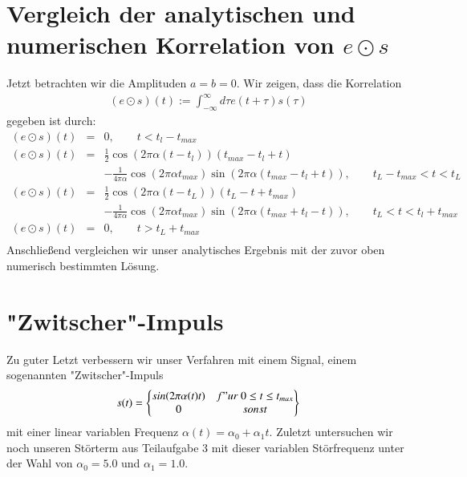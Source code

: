 \documentclass[ngerman]{scrartcl}
\begin{document}
\section{Vergleich der analytischen und numerischen Korrelation von $e \odot s$}
Jetzt betrachten wir die Amplituden $a=b=0$. Wir zeigen, dass die Korrelation 
\begin{align}
(e \odot s)(t):= \int_{-\infty}^{\infty}d\tau e(t+\tau)s(\tau)
\end{align}
gegeben ist durch:
\begin{align}
(e \odot s)(t) & = & 0, \qquad t<t_l-t_{max}\\
(e \odot s)(t) & = & \frac{1}{2}\cos(2\pi \alpha (t-t_l))(t_{max}-t_l+t) \\
&& -\frac{1}{4\pi \alpha} \cos(2\pi \alpha t_{max})\sin(2\pi \alpha (t_{max}-t_l+t)), \qquad t_L-t_{max}<t<t_L \\
(e \odot s)(t) & = & \frac{1}{2} \cos(2\pi \alpha(t-t_L))(t_L-t+t_{max})\\
&& -\frac{1}{4\pi \alpha}\cos(2\pi \alpha t_{max})\sin(2\pi \alpha (t_{max}+t_l-t)), \qquad t_L<t<t_l+t_{max}\\
(e \odot s)(t) & = & 0, \qquad t>t_L+t_{max}\\ 
\end{align}
Anschließend vergleichen wir unser analytisches Ergebnis mit der zuvor oben numerisch bestimmten Lösung. 
\section{"Zwitscher"-Impuls}
Zu guter Letzt verbessern wir unser Verfahren mit einem Signal, einem sogenannten "Zwitscher"-Impuls
\begin{align}
s(t)=\left\{\begin{matrix}sin(2\pi \alpha(t) t) & f"ur \ 0\leq t\leq t_{max}\\ 0 & sonst \end{matrix}\right\}
\end{align}
mit einer linear variablen Frequenz $\alpha(t) = \alpha_0 + \alpha_1 t $.
Zuletzt untersuchen wir noch unseren Störterm aus Teilaufgabe 3 mit dieser variablen Störfrequenz unter der Wahl von $\alpha_0=5.0$ und $\alpha_1=1.0$.
\end{document}
